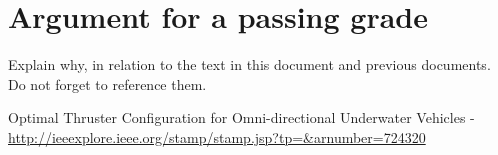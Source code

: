 \documentclass{article}
\begin{document}
\section*{Argument for a passing grade}
Explain why, in relation to the text in this document and previous documents. Do not forget to reference them.

\begin{thebibliography}{99}
Optimal Thruster Configuration for Omni-directional Underwater Vehicles - \url{http://ieeexplore.ieee.org/stamp/stamp.jsp?tp=&arnumber=724320}
\end{thebibliography}
\end{document}
